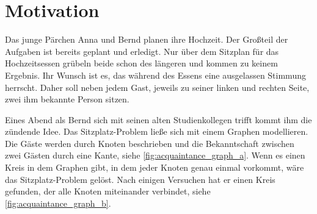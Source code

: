 \documentclass{article}
\newtheorem{mydef}{Definition}
\begin{document}


%
%
%
\section{Motivation}
Das junge Pärchen Anna und Bernd planen ihre Hochzeit. Der Großteil der Aufgaben ist bereits geplant und erledigt. Nur über dem Sitzplan für das Hochzeitsessen grübeln beide schon des längeren und kommen zu keinem Ergebnis. Ihr Wunsch ist es, das während des Essens eine ausgelassen Stimmung herrscht. Daher soll neben jedem Gast, jeweils zu seiner linken und rechten Seite, zwei ihm bekannte Person sitzen.

Eines Abend als Bernd sich mit seinen alten Studienkollegen trifft kommt ihm die zündende Idee. Das Sitzplatz-Problem ließe sich mit einem Graphen modellieren. Die Gäste werden durch Knoten beschrieben und die Bekanntschaft zwischen zwei Gästen durch eine Kante, siehe \autoref{fig:acquaintance_graph_a}. Wenn es einen Kreis in dem Graphen gibt, in dem jeder Knoten genau einmal vorkommt, wäre das Sitzplatz-Problem gelöst. Nach einigen Versuchen hat er einen Kreis gefunden, der alle Knoten miteinander verbindet, siehe \autoref{fig:acquaintance_graph_b}.
\end{document}
